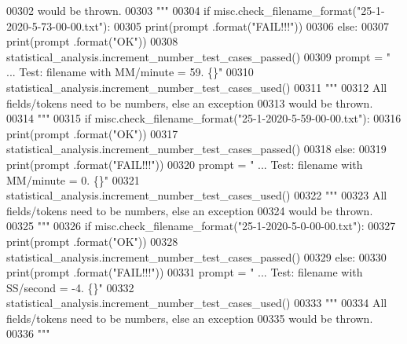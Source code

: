 \begin{DoxyCode}
00302 \textcolor{stringliteral}{                would be thrown.}
00303 \textcolor{stringliteral}{        """}
00304         \textcolor{keywordflow}{if} misc.check\_filename\_format(\textcolor{stringliteral}{"25-1-2020-5-73-00-00.txt"}):
00305             print(prompt .format(\textcolor{stringliteral}{"FAIL!!!"}))
00306         \textcolor{keywordflow}{else}:
00307             print(prompt .format(\textcolor{stringliteral}{"OK"}))
00308             statistical\_analysis.increment\_number\_test\_cases\_passed()
00309         prompt = \textcolor{stringliteral}{"  ... Test: filename with MM/minute = 59.         \{\}"}
00310         statistical\_analysis.increment\_number\_test\_cases\_used()
00311         \textcolor{stringliteral}{"""}
00312 \textcolor{stringliteral}{            All fields/tokens need to be numbers, else an exception}
00313 \textcolor{stringliteral}{                would be thrown.}
00314 \textcolor{stringliteral}{        """}
00315         \textcolor{keywordflow}{if} misc.check\_filename\_format(\textcolor{stringliteral}{"25-1-2020-5-59-00-00.txt"}):
00316             print(prompt .format(\textcolor{stringliteral}{"OK"}))
00317             statistical\_analysis.increment\_number\_test\_cases\_passed()
00318         \textcolor{keywordflow}{else}:
00319             print(prompt .format(\textcolor{stringliteral}{"FAIL!!!"}))
00320         prompt = \textcolor{stringliteral}{"  ... Test: filename with MM/minute = 0.          \{\}"}
00321         statistical\_analysis.increment\_number\_test\_cases\_used()
00322         \textcolor{stringliteral}{"""}
00323 \textcolor{stringliteral}{            All fields/tokens need to be numbers, else an exception}
00324 \textcolor{stringliteral}{                would be thrown.}
00325 \textcolor{stringliteral}{        """}
00326         \textcolor{keywordflow}{if} misc.check\_filename\_format(\textcolor{stringliteral}{"25-1-2020-5-0-00-00.txt"}):
00327             print(prompt .format(\textcolor{stringliteral}{"OK"}))
00328             statistical\_analysis.increment\_number\_test\_cases\_passed()
00329         \textcolor{keywordflow}{else}:
00330             print(prompt .format(\textcolor{stringliteral}{"FAIL!!!"}))
00331         prompt = \textcolor{stringliteral}{"  ... Test: filename with SS/second = -4.         \{\}"}
00332         statistical\_analysis.increment\_number\_test\_cases\_used()
00333         \textcolor{stringliteral}{"""}
00334 \textcolor{stringliteral}{            All fields/tokens need to be numbers, else an exception}
00335 \textcolor{stringliteral}{                would be thrown.}
00336 \textcolor{stringliteral}{        """}

\end{DoxyCode}
